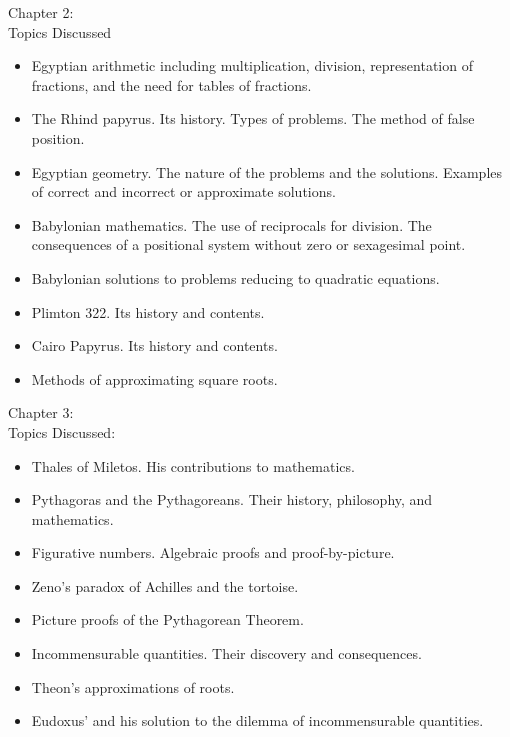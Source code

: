 \documentclass[11pt,fleqn]{article}
\begin{document}
Chapter 2: \\
Topics Discussed 
\begin{itemize}
\item Egyptian arithmetic including multiplication, division, representation of fractions, and the need for tables of fractions. 
\item The Rhind papyrus. Its history. Types of problems. The method of false position. 
\item Egyptian geometry. The nature of the problems and the solutions. Examples of correct and incorrect or approximate solutions.
\item Babylonian mathematics. The use of reciprocals for division. The consequences of a positional system without zero or sexagesimal point.
\item Babylonian solutions to problems reducing to quadratic equations.
\item Plimton 322. Its history and contents. 
\item Cairo Papyrus. Its history and contents. 
\item Methods of approximating square roots.\\
\end{itemize}

Chapter 3:\\
Topics Discussed:
\begin{itemize}
\item Thales of Miletos. His contributions to mathematics.
\item Pythagoras and the Pythagoreans. Their history, philosophy, and mathematics.
\item Figurative numbers. Algebraic proofs and proof-by-picture.
\item Zeno's paradox of Achilles and the tortoise.
\item Picture proofs of the Pythagorean Theorem. 
\item Incommensurable quantities. Their discovery and consequences.
\item Theon's approximations of roots.
\item Eudoxus' and his solution to the dilemma of incommensurable quantities.
\end{itemize}
\end{document}
